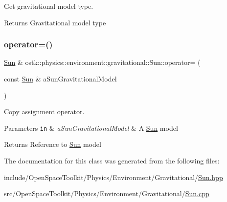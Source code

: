 Get gravitational model type. 

\begin{DoxyReturn}{Returns}
Gravitational model type 
\end{DoxyReturn}
\mbox{\label{classostk_1_1physics_1_1environment_1_1gravitational_1_1_sun_a9eb14731759cdb1a8ab4b92c5e193111}} 
\subsubsection{\texorpdfstring{operator=()}{operator=()}}
{\footnotesize\ttfamily \hyperlink{classostk_1_1physics_1_1environment_1_1gravitational_1_1_sun}{Sun} \& ostk\+::physics\+::environment\+::gravitational\+::\+Sun\+::operator= (\begin{DoxyParamCaption}\item[{const \hyperlink{classostk_1_1physics_1_1environment_1_1gravitational_1_1_sun}{Sun} \&}]{a\+Sun\+Gravitational\+Model }\end{DoxyParamCaption})}



Copy assignment operator. 


\begin{DoxyParams}[1]{Parameters}
\mbox{\tt in}  & {\em a\+Sun\+Gravitational\+Model} & A \hyperlink{classostk_1_1physics_1_1environment_1_1gravitational_1_1_sun}{Sun} model \\
\hline
\end{DoxyParams}
\begin{DoxyReturn}{Returns}
Reference to \hyperlink{classostk_1_1physics_1_1environment_1_1gravitational_1_1_sun}{Sun} model 
\end{DoxyReturn}


The documentation for this class was generated from the following files\+:\begin{DoxyCompactItemize}
\item 
include/\+Open\+Space\+Toolkit/\+Physics/\+Environment/\+Gravitational/\hyperlink{_gravitational_2_sun_8hpp}{Sun.\+hpp}\item 
src/\+Open\+Space\+Toolkit/\+Physics/\+Environment/\+Gravitational/\hyperlink{_gravitational_2_sun_8cpp}{Sun.\+cpp}\end{DoxyCompactItemize}
